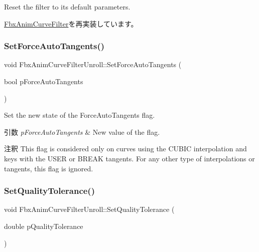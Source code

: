Reset the filter to its default parameters. 

\hyperlink{class_fbx_anim_curve_filter_a57fb35baaaa85adb08946383cf40e811}{Fbx\+Anim\+Curve\+Filter}を再実装しています。

\mbox{\label{class_fbx_anim_curve_filter_unroll_ae4d857f9f855136c18103315e473bbc3}} 
\subsubsection{\texorpdfstring{Set\+Force\+Auto\+Tangents()}{SetForceAutoTangents()}}
{\footnotesize\ttfamily void Fbx\+Anim\+Curve\+Filter\+Unroll\+::\+Set\+Force\+Auto\+Tangents (\begin{DoxyParamCaption}\item[{bool}]{p\+Force\+Auto\+Tangents }\end{DoxyParamCaption})}

Set the new state of the Force\+Auto\+Tangents flag. 
\begin{DoxyParams}{引数}
{\em p\+Force\+Auto\+Tangents} & New value of the flag. \\
\hline
\end{DoxyParams}
\begin{DoxyRemark}{注釈}
This flag is considered only on curves using the C\+U\+B\+IC interpolation and keys with the U\+S\+ER or B\+R\+E\+AK tangents. For any other type of interpolations or tangents, this flag is ignored. 
\end{DoxyRemark}
\mbox{\label{class_fbx_anim_curve_filter_unroll_ad8570bf12f5c397fb975fe961aeed29f}} 
\subsubsection{\texorpdfstring{Set\+Quality\+Tolerance()}{SetQualityTolerance()}}
{\footnotesize\ttfamily void Fbx\+Anim\+Curve\+Filter\+Unroll\+::\+Set\+Quality\+Tolerance (\begin{DoxyParamCaption}\item[{double}]{p\+Quality\+Tolerance }\end{DoxyParamCaption})}

